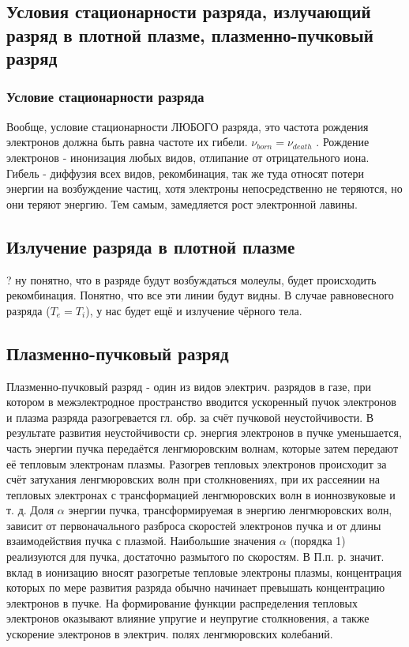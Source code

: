 \documentclass[10pt, a4paper]{article}
\begin{document}
\subsection{Условия стационарности разряда, излучающий разряд в плотной плазме, плазменно-пучковый разряд}
\subsubsection{Условие стационарности разряда}

Вообще, условие стационарности ЛЮБОГО разряда,  это частота рождения электронов должна быть равна частоте их гибели. $\nu_{born} = \nu_{death}$ . Рождение электронов - инонизация любых видов, отлипание от отрицательного иона. Гибель - диффузия всех видов, рекомбинация, так же туда относят потери энергии на возбуждение частиц, хотя электроны непосредственно не теряются, но они теряют энергию. Тем самым, замедляется рост электронной лавины. 

\subsection{Излучение разряда в плотной плазме}

?
ну понятно, что в разряде будут возбуждаться молеулы, будет происходить рекомбинация. Понятно, что все эти линии будут видны. В случае равновесного разряда ($T_e = T_i$), у нас будет ещё и излучение чёрного тела.

\subsection{Плазменно-пучковый разряд}

Плазменно-пучковый разряд - один из видов электрич. разрядов в газе, при котором в межэлектродное пространство вводится ускоренный пучок электронов и плазма разряда разогревается гл. обр. за счёт пучковой неустойчивости. В результате развития неустойчивости ср. энергия электронов в пучке уменьшается, часть энергии пучка передаётся ленгмюровским волнам, которые затем передают её тепловым электронам плазмы. Разогрев тепловых электронов происходит за счёт затухания ленгмюровских волн при столкновениях, при их рассеянии на тепловых электронах с трансформацией ленгмюровских волн в ионнозвуковые и т. д.
Доля $\alpha$ энергии пучка, трансформируемая в энергию ленгмюровских волн, зависит от первоначального разброса скоростей электронов пуч­ка и от длины взаимодействия пучка с плазмой. Наибольшие значения $\alpha$  (порядка 1) реализуются для пучка, достаточно размытого по скоростям.
В П.п. р. значит. вклад в ионизацию вносят разогретые тепловые электроны плазмы, концентрация которых по мере развития разряда обычно начинает превышать концентрацию электронов в пучке. На формирование функции распределения тепловых электронов оказывают влияние упругие и неупругие столкновения, а так­же ускорение электронов в электрич. полях ленгмюровских колебаний.
\end{document}
